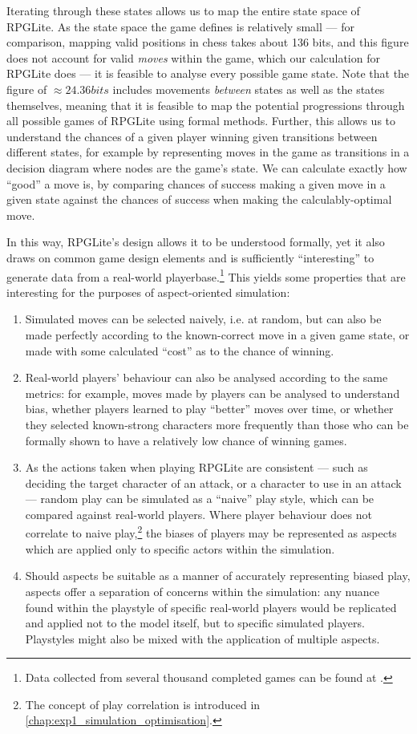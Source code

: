 Iterating through these states allows us to map the entire state space of
RPGLite. As the state space the game defines is relatively small --- for
comparison, mapping valid positions in chess takes about 136
bits\cite{information_content_chess}, and this figure does not account for valid
\emph{moves} within the game, which our calculation for RPGLite does --- it is
feasible to analyse every possible game state. Note that the figure of \(\approx
24.36 bits\) includes movements \emph{between} states as well as the states
themselves, meaning that it is feasible to map the potential progressions
through all possible games of RPGLite using formal methods. Further, this allows
us to understand the chances of a given player winning given transitions between
different states, for example by representing moves in the game as transitions
in a decision diagram where nodes are the game's state. We can calculate exactly
how ``good'' a move is, by comparing chances of success making a given move in a
given state against the chances of success when making the calculably-optimal
move.

In this way, RPGLite's design allows it to be understood formally, yet it also
draws on common game design elements and is sufficiently ``interesting'' to
generate data from a real-world playerbase.\footnote{Data collected from several
thousand completed games can be found at \cite{rpglite_dataset}.} This yields
some properties that are interesting for the purposes of aspect-oriented
simulation:

\begin{enumerate} \item Simulated moves can be selected naively, i.e. at random,
but can also be made perfectly according to the known-correct move in a given
game state, or made with some calculated ``cost'' as to the chance of winning.
\item Real-world players' behaviour can also be analysed according to the same
metrics: for example, moves made by players can be analysed to understand bias,
whether players learned to play ``better'' moves over time, or whether they
selected known-strong characters more frequently than those who can be formally
shown to have a relatively low chance of winning games.  \item As the actions
taken when playing RPGLite are consistent --- such as deciding the target
character of an attack, or a character to use in an attack --- random play can
be simulated as a ``naive'' play style, which can be compared against real-world
players. Where player behaviour does not correlate to naive play,\footnote{The
concept of play correlation is introduced in
\cref{chap:exp1_simulation_optimisation}.} the biases of players may be
represented as aspects which are applied only to specific actors within the
simulation.  \item Should aspects be suitable as a manner of accurately
representing biased play, aspects offer a separation of concerns within the
simulation: any nuance found within the playstyle of specific real-world players
would be replicated and applied not to the model itself, but to specific
simulated players. Playstyles might also be mixed with the application of
multiple aspects.  \end{enumerate}

